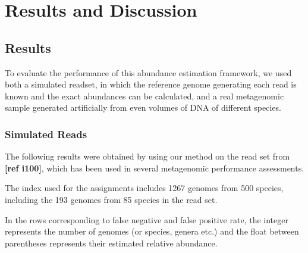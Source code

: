 
\chapter{Results and Discussion}
\label{Chapter4}

\section{Results}

To evaluate the performance of this abundance estimation framework, we used both a simulated readset, in which the reference genome generating each read is known and the exact abundances can be calculated, and a real metagenomic sample generated artificially from even volumes of DNA of different species.

\subsection{Simulated Reads}

The following results were obtained by using our method on the read set from \textbf{[ref i100]}, which has been used in several metagenomic performance assessments.

The index used for the assignments includes 1267 genomes from 500 species, including the 193 genomes from 85 species in the read set.

In the rows corresponding to false negative and false positive rate, the integer represents the number of genomes (or species, genera etc.) and the float between parentheses represents their estimated relative abundance.

